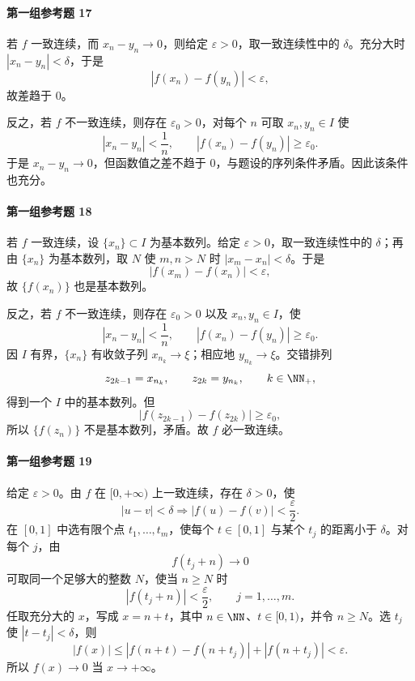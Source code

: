 \paragraph{第一组参考题 17}
\begin{xsolution}
若 $f$ 一致连续，而 $x_n-y_n\to0$，则给定 $\varepsilon>0$，取一致连续性中的 $\delta$。充分大时 $|x_n-y_n|<\delta$，于是
\[
 |f(x_n)-f(y_n)|<\varepsilon,
\]
故差趋于 $0$。

反之，若 $f$ 不一致连续，则存在 $\varepsilon_0>0$，对每个 $n$ 可取 $x_n,y_n\in I$ 使
\[
 |x_n-y_n|<\frac1n,
 \qquad
 |f(x_n)-f(y_n)|\ge\varepsilon_0.
\]
于是 $x_n-y_n\to0$，但函数值之差不趋于 $0$，与题设的序列条件矛盾。因此该条件也充分。
\end{xsolution}

\paragraph{第一组参考题 18}
\begin{xsolution}
若 $f$ 一致连续，设 $\{x_n\}\subset I$ 为基本数列。给定 $\varepsilon>0$，取一致连续性中的 $\delta$；再由 $\{x_n\}$ 为基本数列，取 $N$ 使 $m,n>N$ 时 $|x_m-x_n|<\delta$。于是
\[
 |f(x_m)-f(x_n)|<\varepsilon,
\]
故 $\{f(x_n)\}$ 也是基本数列。

反之，若 $f$ 不一致连续，则存在 $\varepsilon_0>0$ 以及 $x_n,y_n\in I$，使
\[
 |x_n-y_n|<\frac1n,
 \qquad |f(x_n)-f(y_n)|\ge\varepsilon_0.
\]
因 $I$ 有界，$\{x_n\}$ 有收敛子列 $x_{n_k}\to\xi$；相应地 $y_{n_k}\to\xi$。交错排列
\[
 z_{2k-1}=x_{n_k},
 \qquad z_{2k}=y_{n_k},
 \qquad k\in\NN_+,
\]
得到一个 $I$ 中的基本数列。但
\[
 |f(z_{2k-1})-f(z_{2k})|
 \ge\varepsilon_0,
\]
所以 $\{f(z_n)\}$ 不是基本数列，矛盾。故 $f$ 必一致连续。
\end{xsolution}

\paragraph{第一组参考题 19}
\begin{xsolution}
给定 $\varepsilon>0$。由 $f$ 在 $[0,+\infty)$ 上一致连续，存在 $\delta>0$，使
\[
 |u-v|<\delta
 \Longrightarrow
 |f(u)-f(v)|<\frac\varepsilon2.
\]
在 $[0,1]$ 中选有限个点 $t_1,\ldots,t_m$，使每个 $t\in[0,1]$ 与某个 $t_j$ 的距离小于 $\delta$。对每个 $j$，由
\[
 f(t_j+n)\to0
\]
可取同一个足够大的整数 $N$，使当 $n\ge N$ 时
\[
 |f(t_j+n)|<\frac\varepsilon2,
 \qquad j=1,\ldots,m.
\]
任取充分大的 $x$，写成 $x=n+t$，其中 $n\in\NN$、$t\in[0,1)$，并令 $n\ge N$。选 $t_j$ 使 $|t-t_j|<\delta$，则
\[
 |f(x)|
 \le |f(n+t)-f(n+t_j)|+|f(n+t_j)|
 <\varepsilon.
\]
所以 $f(x)\to0$ 当 $x\to+\infty$。
\end{xsolution}

